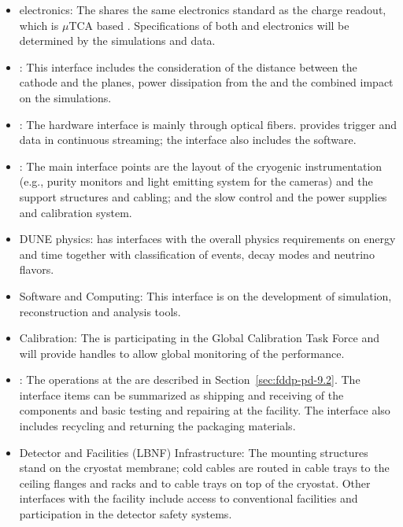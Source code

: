\begin{itemize}

\item {} electronics: The  shares the same  electronics standard as the charge readout, which is $\mu$TCA based \cite{utca}. Specifications of both  and  electronics will be determined by the simulations and  data.

\item {}: This interface includes the consideration of the distance between the cathode and the  planes, power dissipation from the  and the combined impact on the simulations.

\item {}: The hardware interface is mainly through optical fibers.   provides trigger and data in continuous streaming;  the interface also includes the  software.

\item {}: The main interface points are the layout of the cryogenic instrumentation (e.g., purity monitors and light emitting system for the cameras) and the  support structures and cabling; and the slow control and the  power supplies and calibration system.

\item DUNE physics: \dual {} has interfaces with the overall physics requirements on energy and time together with classification of events, decay modes and neutrino flavors.

\item Software and Computing: This interface is on the development of simulation, reconstruction and analysis tools.

\item Calibration: The  is participating in the Global Calibration Task Force and will provide handles to allow global monitoring of the  performance.

\item {}: The operations at the  are described in Section~\ref{sec:fddp-pd-9.2}. The interface items can be summarized as shipping and receiving of the  components and basic testing and repairing at the facility. The interface also includes recycling and returning the packaging materials.

\item Detector and Facilities (LBNF) Infrastructure: The  %
 mounting structures stand on the cryostat membrane; cold cables are routed in cable trays to the ceiling \fdth flanges and racks and to cable trays on top of the cryostat. Other interfaces with the facility include access to conventional facilities and participation in the detector safety systems. 


\end{itemize}
